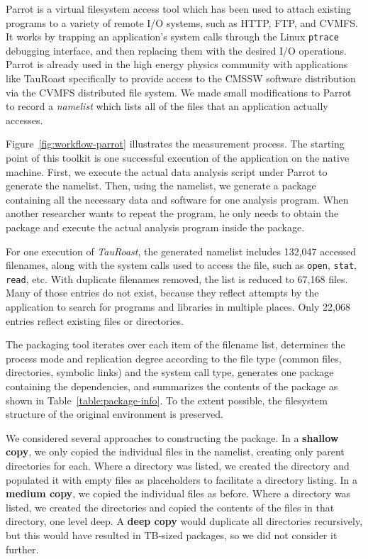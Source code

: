 \documentclass[procedia]{easychair}
\begin{document}
Parrot is a virtual filesystem access tool which has been used to attach
existing programs to a variety of remote I/O systems, such as HTTP, FTP, and CVMFS.
It works by trapping an application's system calls through the Linux {\tt ptrace} debugging
interface, and then replacing them with the desired I/O operations.  Parrot is already used
in the high energy physics community with applications like TauRoast specifically to 
provide access to the CMSSW software distribution via the CVMFS distributed file system.
We made small modifications to Parrot to record a \emph{namelist} which lists all 
of the files that an application actually accesses.

Figure~\ref{fig:workflow-parrot} illustrates the measurement process.
The starting point of this toolkit is one successful execution of the application on the native machine.
First, we execute the actual data analysis script under Parrot to generate the namelist.
Then, using the namelist, we generate a package containing all the necessary data
and software for one analysis program. When another
researcher wants to repeat the program, he only needs to obtain the package and
execute the actual analysis program inside the package. 

For one execution of \emph{TauRoast}, the generated namelist includes 132,047 accessed filenames,
along with the system calls used to access the file, such as {\tt open}, {\tt stat}, {\tt read}, etc.
With duplicate filenames removed, the list is reduced to 67,168 files.
Many of those entries do not exist, because they reflect attempts
by the application to search for programs and libraries in multiple places.
Only 22,068 entries reflect existing files or directories.

The packaging tool iterates over each item of the filename list, determines the process
mode and replication degree according to the file type (common files,
directories, symbolic links) and the system call type, generates one package
containing the dependencies, and summarizes the contents of the package
as shown in Table~\ref{table:package-info}.  To the extent possible,
the filesystem structure of the original environment is preserved.

We considered several approaches to constructing the package.
In a {\bf shallow copy}, we only copied the individual files in the namelist,
creating only parent directories for each.  Where a directory was listed,
we created the directory and populated it with empty files as placeholders
to facilitate a directory listing.  In a {\bf medium copy}, we copied the
individual files as before.  Where a directory was listed, we created
the directories and copied the contents of the files in that directory,
one level deep.  A {\bf deep copy} would duplicate all directories recursively,
but this would have resulted in TB-sized packages, so we did not consider
it further.
\end{document}
